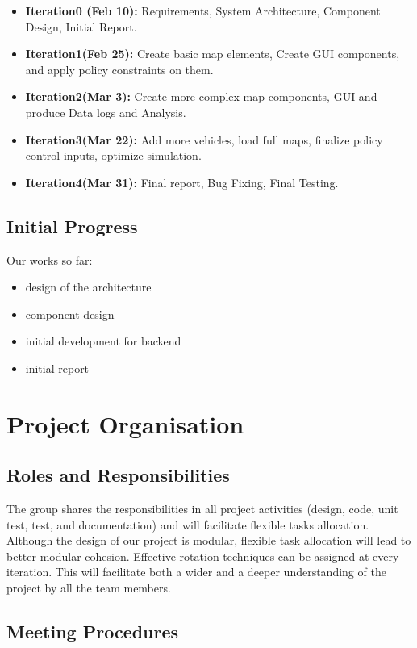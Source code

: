 \documentclass[11pt]{article}
\begin{document}
\begin{itemize}
\item
\textbf{Iteration0 (Feb 10):} Requirements, System Architecture, Component Design, Initial Report.
 \item \textbf{Iteration1(Feb 25):}  Create basic map elements, Create GUI components, and apply policy constraints on them.
 \item \textbf{Iteration2(Mar 3):} Create more complex map components, GUI and produce Data logs and Analysis.
 \item \textbf{Iteration3(Mar 22):} Add more vehicles, load full maps, finalize policy control inputs, optimize simulation.
 \item \textbf{Iteration4(Mar 31):} Final report, Bug Fixing, Final Testing.


\end{itemize}
	
\subsection{Initial Progress}
Our works so far:
\begin{itemize}
	\item design of the architecture
	\item component design
	\item initial development for backend
	\item initial report
\end{itemize}


\section{Project Organisation}

\subsection{Roles and Responsibilities}

The group shares the responsibilities in all project activities (design, code, unit test, test, and documentation) and will facilitate flexible tasks allocation. Although the design of our project is modular, flexible task allocation will lead to better modular cohesion. Effective rotation techniques can be assigned at every iteration. This will facilitate both a wider and a deeper understanding of the project by all the team members. 

\subsection{Meeting Procedures}
\end{document}
